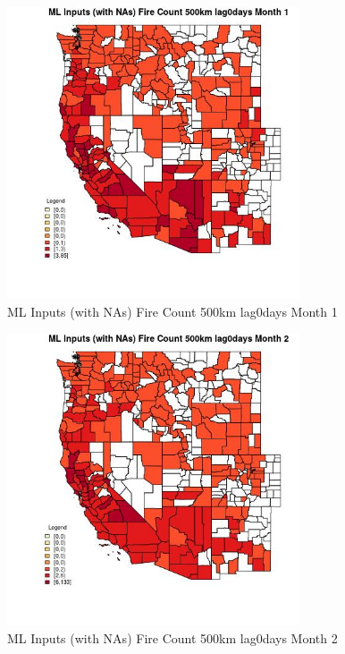 \begin{figure} 
\centering  
\includegraphics[width=0.77\textwidth]{Code_Outputs/Report_ML_input_PM25_Step4_part_e_de_duplicated_aves_compiled_2019-05-21wNAs_CountyFire_Count_500km_lag0daysmedianMonth1.jpg} 
\caption{\label{fig:Report_ML_input_PM25_Step4_part_e_de_duplicated_aves_compiled_2019-05-21wNAsCountyFire_Count_500km_lag0daysmedianMonth1}ML Inputs (with NAs) Fire Count 500km lag0days Month 1} 
\end{figure} 
 

\begin{figure} 
\centering  
\includegraphics[width=0.77\textwidth]{Code_Outputs/Report_ML_input_PM25_Step4_part_e_de_duplicated_aves_compiled_2019-05-21wNAs_CountyFire_Count_500km_lag0daysmedianMonth2.jpg} 
\caption{\label{fig:Report_ML_input_PM25_Step4_part_e_de_duplicated_aves_compiled_2019-05-21wNAsCountyFire_Count_500km_lag0daysmedianMonth2}ML Inputs (with NAs) Fire Count 500km lag0days Month 2} 
\end{figure} 
 

